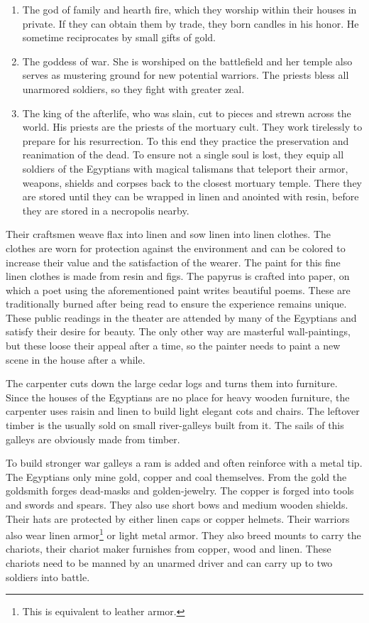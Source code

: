 \documentclass[a4paper]{article}
\begin{document}
	\begin{enumerate}
		\item The god of family and hearth fire, which they worship within their houses in private.
			If they can obtain them by trade, they born candles in his honor.
			He sometime reciprocates by small gifts of gold.
		\item The goddess of war. She is worshiped on the battlefield and her temple
			also serves as mustering ground for new potential warriors.
			The priests bless all unarmored soldiers, so they fight with greater zeal.
		\item The king of the afterlife, who was slain, cut to pieces and strewn across the world.
			His priests are the priests of the mortuary cult.
			They work tirelessly to prepare for his resurrection.
			To this end they practice the preservation and reanimation of the dead.
			To ensure not a single soul is lost,
			they equip all soldiers of the \gls{Egyptians} with magical talismans
			that teleport their armor, weapons, shields and corpses back to the closest mortuary temple.
			There they are stored until they can be wrapped in linen and anointed with resin,
			before they are stored in a necropolis nearby.
	\end{enumerate}

	Their craftsmen weave flax into linen and sow linen into linen clothes.
	The clothes are worn for protection against the environment
	and can be colored to increase their value and the satisfaction of the wearer. 
	The paint for this fine linen clothes is made from resin and figs.
	The papyrus is crafted into paper, on which a poet using the aforementioned paint
	writes beautiful poems.
	These are traditionally burned after being read to ensure the experience remains unique.
	These public readings in the theater are attended by many of the \gls{Egyptians}
	and satisfy their desire for beauty.
	The only other way are masterful wall-paintings,
	but these loose their appeal after a time,
	so the painter needs to paint a new scene in the house after a while.

	The carpenter cuts down the large cedar logs and turns them into furniture.
	Since the houses of the \gls{Egyptians} are no place for heavy wooden furniture,
	the carpenter uses raisin and linen to build light elegant cots and chairs.
	The leftover timber is the usually sold on small river-galleys built from it.
	The sails of this galleys are obviously made from timber.

	To build stronger war galleys a ram is added and often reinforce with a metal tip.
	The \gls{Egyptians} only mine gold, copper and coal themselves.
	From the gold the goldsmith forges dead-masks and golden-jewelry.
	The copper is forged into tools and swords and spears.
	They also use short bows and medium wooden shields.
	Their hats are protected by either linen caps or copper helmets.
	Their warriors also wear linen armor\footnote{
		This is equivalent to leather armor.
	} or light metal armor.
	They also breed mounts to carry the chariots, their chariot maker
	furnishes from copper, wood and linen.
	These chariots need to be manned by an unarmed driver and can carry up to two soldiers into battle.
\end{document}
